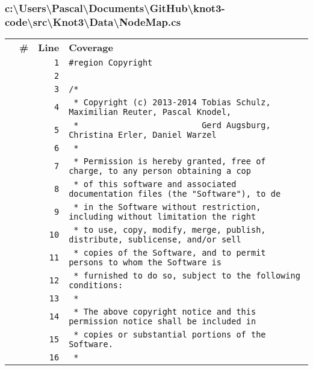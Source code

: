 \documentclass[a4paper,10pt]{article}
\begin{document}
\subsubsection{c:\textbackslash Users\textbackslash Pascal\textbackslash Documents\textbackslash GitHub\textbackslash knot3-code\textbackslash src\textbackslash Knot3\textbackslash Data\textbackslash NodeMap.cs}
\begin{longtable}[l]{lrrl}
\textbf{} & \textbf{\#} & \textbf{Line} & \textbf{Coverage}\\
\cellcolor{gray} &  & \verb~1~ & \verb~#region Copyright~\\
\cellcolor{gray} &  & \verb~2~ & \verb~~\\
\cellcolor{gray} &  & \verb~3~ & \verb~/*~\\
\cellcolor{gray} &  & \verb~4~ & \verb~ * Copyright (c) 2013-2014 Tobias Schulz, Maximilian Reuter, Pascal Knodel,~\\
\cellcolor{gray} &  & \verb~5~ & \verb~ *                         Gerd Augsburg, Christina Erler, Daniel Warzel~\\
\cellcolor{gray} &  & \verb~6~ & \verb~ *~\\
\cellcolor{gray} &  & \verb~7~ & \verb~ * Permission is hereby granted, free of charge, to any person obtaining a cop~\\
\cellcolor{gray} &  & \verb~8~ & \verb~ * of this software and associated documentation files (the "Software"), to de~\\
\cellcolor{gray} &  & \verb~9~ & \verb~ * in the Software without restriction, including without limitation the right~\\
\cellcolor{gray} &  & \verb~10~ & \verb~ * to use, copy, modify, merge, publish, distribute, sublicense, and/or sell~\\
\cellcolor{gray} &  & \verb~11~ & \verb~ * copies of the Software, and to permit persons to whom the Software is~\\
\cellcolor{gray} &  & \verb~12~ & \verb~ * furnished to do so, subject to the following conditions:~\\
\cellcolor{gray} &  & \verb~13~ & \verb~ *~\\
\cellcolor{gray} &  & \verb~14~ & \verb~ * The above copyright notice and this permission notice shall be included in ~\\
\cellcolor{gray} &  & \verb~15~ & \verb~ * copies or substantial portions of the Software.~\\
\cellcolor{gray} &  & \verb~16~ & \verb~ *~\\

\end{longtable}
\end{document}
